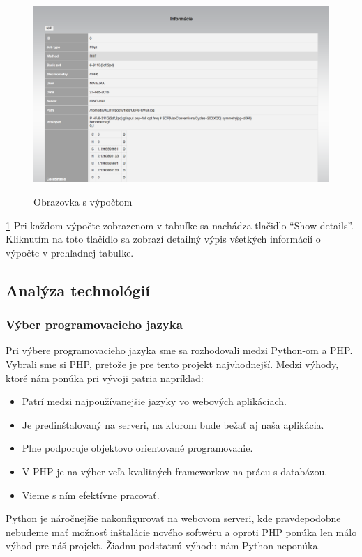 \documentclass[12pt,a4paper]{article}
\begin{document}
\begin{figure}[H]
	\caption{Obrazovka s výpočtom}
	\includegraphics[width=\textwidth]{item}
	\label{fig:ui3}
\end{figure}
\ref{fig:ui3}
Pri každom výpočte zobrazenom v tabuľke sa nachádza tlačidlo “Show details”. Kliknutím na toto tlačidlo sa zobrazí detailný výpis všetkých informácií o výpočte v prehľadnej tabuľke.

\pagebreak

\subsection{Analýza technológií}

\subsubsection{Výber programovacieho jazyka}
Pri výbere programovacieho jazyka sme sa rozhodovali medzi Python-om a PHP. Vybrali sme si PHP, pretože je pre tento projekt najvhodnejší. Medzi výhody, ktoré nám ponúka pri vývoji patria napríklad:
\begin{itemize}
	\item Patrí medzi najpoužívanejšie jazyky vo webových aplikáciach.
	\item Je predinštalovaný na serveri, na ktorom bude bežať aj naša aplikácia.
	\item Plne podporuje objektovo orientované programovanie.
	\item V PHP je na výber veľa kvalitných frameworkov na prácu s databázou.
	\item Vieme s ním efektívne pracovať.
\end{itemize}
Python je náročnejšie nakonfigurovať na webovom serveri, kde pravdepodobne nebudeme mať možnosť inštalácie nového softwéru a oproti PHP ponúka len málo výhod pre náš projekt. Žiadnu podstatnú výhodu nám Python neponúka.
\end{document}
